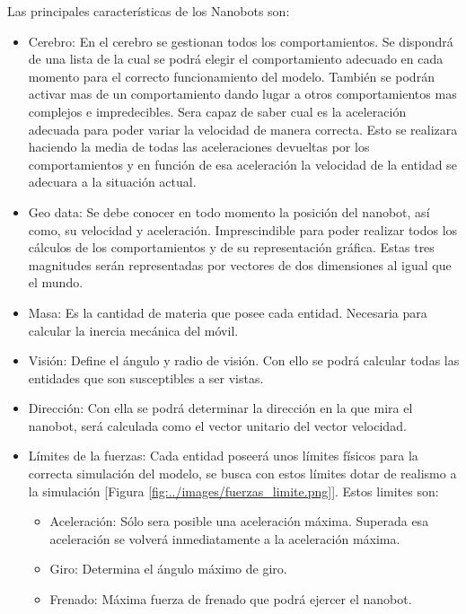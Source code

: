 \noindent Las principales características de los Nanobots son:  
\begin{itemize}
 \item  Cerebro: En el cerebro se gestionan todos los comportamientos. Se dispondrá de una lista de la cual se podrá elegir el comportamiento adecuado en cada momento para el correcto funcionamiento del modelo. También se podrán activar mas de un comportamiento dando lugar a otros comportamientos mas complejos e impredecibles. Sera capaz de saber cual es la aceleración adecuada para poder variar la velocidad de manera correcta. Esto se realizara haciendo la media de todas las aceleraciones devueltas por los comportamientos y en función de esa aceleración la velocidad de la entidad se adecuara a la situación actual.
 \item Geo data: Se debe conocer en todo momento la posición del nanobot, así como, su velocidad y aceleración. Imprescindible para poder realizar todos los cálculos de los comportamientos y de su representación gráfica. Estas tres magnitudes serán representadas por vectores de dos dimensiones al igual que el mundo.
 \item Masa: Es la cantidad de materia que posee cada entidad. Necesaria para calcular la inercia mecánica del móvil. 
 \item Visión: Define el ángulo y radio de visión. Con ello se podrá calcular todas las entidades que son susceptibles a ser vistas.
 \item Dirección: Con ella se podrá determinar la dirección en la que mira el nanobot, será calculada como el vector unitario del vector velocidad.
 \item Límites de la fuerzas: Cada entidad poseerá unos límites físicos para la correcta simulación del modelo, se busca con estos límites dotar de realismo a la simulación [Figura \ref{fig:../images/fuerzas_limite.png}]. 
 Estos limites son:
 \begin{itemize}
   \item Aceleración: Sólo sera posible una aceleración máxima. Superada esa aceleración se volverá inmediatamente a la aceleración máxima.
   \item Giro: Determina el ángulo máximo de giro.
   \item Frenado: Máxima fuerza de frenado que podrá ejercer el nanobot. 
 \end{itemize}	
\begin{figure}[h]
 \centering

\end{figure}
\end{itemize}
